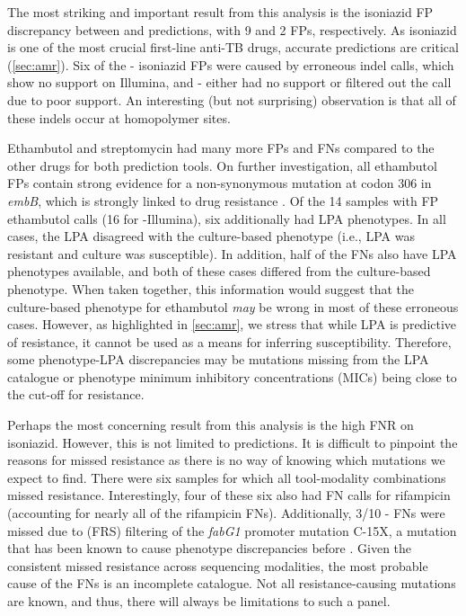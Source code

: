The most striking and important result from this analysis is the isoniazid FP discrepancy between \mykrobe{} and \drprg{} \ont{} predictions, with 9 and 2 FPs, respectively. As isoniazid is one of the most crucial first-line anti-TB drugs, accurate predictions are critical (\autoref{sec:amr}). Six of the \mykrobe{}-\ont{} isoniazid FPs were caused by erroneous indel calls, which show no support on Illumina, and \drprg{}-\ont{} either had no support or filtered out the call due to poor support. An interesting (but not surprising) observation is that all of these indels occur at homopolymer sites.

Ethambutol and streptomycin had many more FPs and FNs compared to the other drugs for both prediction tools. On further investigation, all ethambutol FPs contain strong evidence for a non-synonymous mutation at codon 306 in \textit{embB}, which is strongly linked to drug resistance \cite{Maningi2017,Srivastava2009,Brossier2015}. Of the 14 samples with FP ethambutol calls (16 for \mykrobe{}-Illumina), six additionally had LPA phenotypes. In all cases, the LPA disagreed with the culture-based phenotype (i.e., LPA was resistant and culture was susceptible). In addition, half of the FNs also have LPA phenotypes available, and both of these cases differed from the culture-based phenotype. When taken together, this information would suggest that the culture-based phenotype for ethambutol \emph{may} be wrong in most of these erroneous cases. However, as highlighted in \autoref{sec:amr}, we stress that while LPA is predictive of resistance, it cannot be used as a means for inferring susceptibility. Therefore, some phenotype-LPA discrepancies may be mutations missing from the LPA catalogue or phenotype minimum inhibitory concentrations (MICs) being close to the cut-off for resistance.

Perhaps the most concerning result from this analysis is the high FNR on isoniazid. However, this is not limited to \ont{} predictions. It is difficult to pinpoint the reasons for missed resistance as there is no way of knowing which mutations we expect to find. There were six samples for which all tool-modality combinations missed resistance. Interestingly, four of these six also had FN calls for rifampicin (accounting for nearly all of the rifampicin FNs). Additionally, 3/10 \drprg{}-\ont{} FNs were missed due to (FRS) filtering of the \textit{fabG1} promoter mutation C-15X, a mutation that has been known to cause phenotype discrepancies before \cite{cryptic2018}. Given the consistent missed resistance across sequencing modalities, the most probable cause of the FNs is an incomplete catalogue. Not all resistance-causing mutations are known, and thus, there will always be limitations to such a panel.

